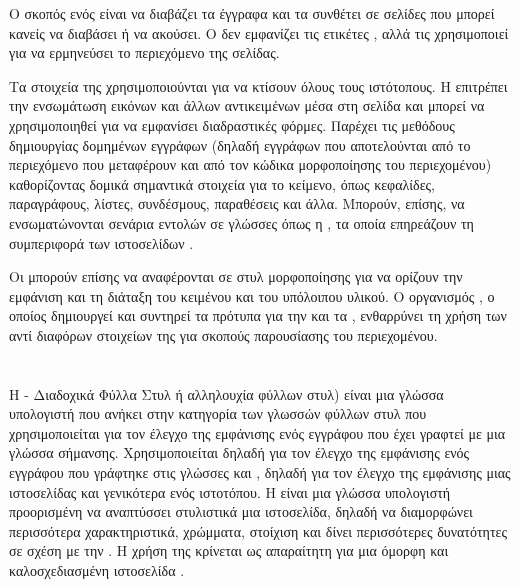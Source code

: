 \par Ο σκοπός ενός {} είναι να διαβάζει τα έγγραφα {} και τα συνθέτει σε σελίδες που μπορεί κανείς να διαβάσει ή να ακούσει. 
Ο {} δεν εμφανίζει τις ετικέτες {}, αλλά τις χρησιμοποιεί για να ερμηνεύσει το περιεχόμενο της σελίδας.

\par Τα στοιχεία της {} χρησιμοποιούνται για να κτίσουν όλους τους ιστότοπους. 
Η {} επιτρέπει την ενσωμάτωση εικόνων και άλλων αντικειμένων μέσα στη σελίδα 
και μπορεί να χρησιμοποιηθεί για να εμφανίσει διαδραστικές φόρμες. 
Παρέχει τις μεθόδους δημιουργίας δομημένων εγγράφων (δηλαδή εγγράφων που αποτελούνται από το περιεχόμενο που μεταφέρουν 
και από τον κώδικα μορφοποίησης του περιεχομένου) καθορίζοντας δομικά σημαντικά στοιχεία για το κείμενο, 
όπως κεφαλίδες, παραγράφους, λίστες, συνδέσμους, παραθέσεις και άλλα. 
Μπορούν, επίσης, να ενσωματώνονται σενάρια εντολών σε γλώσσες όπως η {}, 
τα οποία επηρεάζουν τη συμπεριφορά των ιστοσελίδων {}.

\par Οι {} μπορούν επίσης να αναφέρονται σε στυλ μορφοποίησης {} 
για να ορίζουν την εμφάνιση και τη διάταξη του κειμένου και του υπόλοιπου υλικού. 
Ο οργανισμός {}, ο οποίος δημιουργεί και συντηρεί τα πρότυπα για την {} και τα {}, 
ενθαρρύνει τη χρήση των {} αντί διαφόρων στοιχείων της {} για σκοπούς παρουσίασης του περιεχομένου.

\section{}

Η {} \cite{w3css} - Διαδοχικά Φύλλα Στυλ ή αλληλουχία
φύλλων στυλ) είναι μια γλώσσα υπολογιστή που ανήκει στην κατηγορία των
γλωσσών φύλλων στυλ που χρησιμοποιείται για τον έλεγχο της εμφάνισης
ενός εγγράφου που έχει γραφτεί με μια γλώσσα σήμανσης. Χρησιμοποιείται
δηλαδή για τον έλεγχο της εμφάνισης ενός εγγράφου που γράφτηκε στις
γλώσσες {} και {}, δηλαδή για τον έλεγχο της εμφάνισης μιας
ιστοσελίδας και γενικότερα ενός ιστοτόπου.
Η {} είναι μια γλώσσα υπολογιστή προορισμένη να αναπτύσσει στυλιστικά μια ιστοσελίδα, 
δηλαδή να διαμορφώνει περισσότερα χαρακτηριστικά, χρώμματα, στοίχιση και δίνει περισσότερες δυνατότητες σε σχέση με την {}.
Η χρήση της {} κρίνεται ως απαραίτητη για μια όμορφη και καλοσχεδιασμένη ιστοσελίδα .

